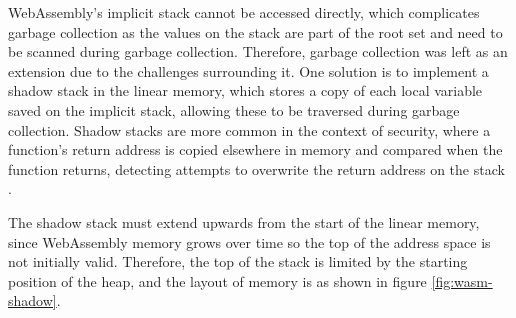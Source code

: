 WebAssembly's implicit stack cannot be accessed directly, which complicates garbage collection as the values on the stack are part of the root set and need to be scanned during garbage collection. Therefore, garbage collection was left as an extension due to the challenges surrounding it. One solution is to implement a shadow stack in the linear memory, which stores a copy of each local variable saved on the implicit stack, allowing these to be traversed during garbage collection. Shadow stacks are more common in the context of security, where a function's return address is copied elsewhere in memory and compared when the function returns, detecting attempts to overwrite the return address on the stack \cite{shadow-stack}. %

The shadow stack must extend upwards from the start of the linear memory, since WebAssembly memory grows over time so the top of the address space is not initially valid. Therefore, the top of the stack is limited by the starting position of the heap, and the layout of memory is as shown in figure \ref{fig:wasm-shadow}. %






